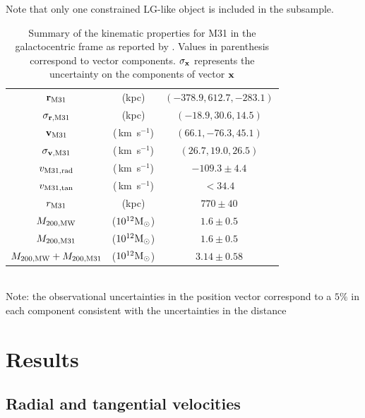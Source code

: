 \documentclass{emulateapj}
\newcommand{\kms}{\,km~s$^{-1}$}
\newcommand{\Msun}{{\ifmmode{{\rm {M_{\odot}}}}\else{${\rm{M_{\odot}}}$}\fi}}
\begin{document}
Note that only one constrained LG-like object is included in the subsample.


\begin{table}
\caption{Summary of the kinematic properties for M31 in the galactocentric frame as reported by \citep{vanderMarel12}. Values in parenthesis correspond to vector components. $\sigma_{\bf x}$ represents the uncertainty on the components of vector ${\bf x}$}
\begin{center}
\begin{tabular}{ccc}\hline\hline
${\bf r}_{\rm M31}$ & (kpc) &$(-378.9, 612.7, -283.1)$\\
$\sigma_{{\bf r}, {\rm M31}}$ & (kpc) &$(-18.9, 30.6, 14.5)$\\
${\bf v}_{\rm M31}$ & (\kms) & $(66.1, -76.3, 45.1)$\\
$\sigma_{{\bf v},{\rm M31}}$ & (\kms) &$(26.7, 19.0, 26.5)$\\
$v_{\rm M31,rad}$ &(\kms) & $-109.3\pm 4.4$\\
$v_{\rm M31,tan}$ &(\kms) & $<34.4$\\
$r_{\rm M31}$ &(kpc) & $770\pm 40$\\
$M_{\rm 200, MW}$ & ($10^{12}\Msun$) & $1.6\pm0.5$ \\
$M_{\rm 200, M31}$ & ($10^{12}\Msun$) & $1.6\pm0.5$ \\
$M_{\rm 200,MW} + M_{\rm 200, M31}$ & ($10^{12}\Msun$) & $3.14\pm 0.58$\\\hline

\end{tabular}\\
\vspace{1mm}
Note: the observational uncertainties in the position vector
correspond to a $5\%$ in each component consistent with the
uncertainties in the distance \citep[see references
  in][]{vanderMarel08} 
\end{center}
\label{table:1}
\end{table}



\section{Results}
\label{sec:results}




\subsection{Radial and tangential velocities}
\end{document}
